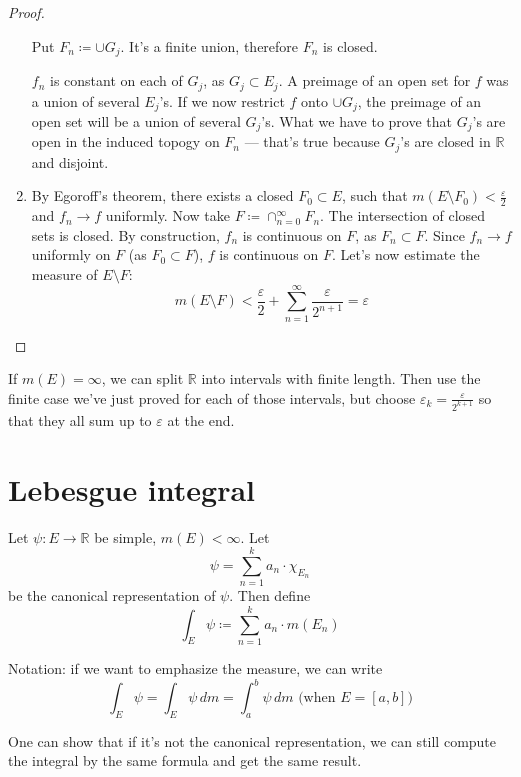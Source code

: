 \begin{proof}
\begin{enumerate}
{            Put $F_n \coloneqq \cup G_j$. It's a finite union, therefore $F_n$ is closed.

            $f_n$ is constant on each of $G_j$, as $G_j \subset E_j$.
            A preimage of an open set for $f$ was a union of several $E_j$'s.
            If we now restrict $f$ onto $\cup G_j$, the preimage of an open set
            will be a union of several $G_j$'s. What we have to prove that 
            $G_j$'s are open in the induced topogy on $F_n$ --- that's 
            true because $G_j$'s are closed in $\mathbb{R}$ and disjoint.
        }
        \item {
            By Egoroff's theorem, there exists a closed $F_0 \subset E$, 
            such that $m(E \setminus F_0) < \frac{\varepsilon}{2}$ and 
            $f_n \to f$ uniformly.
            Now take $F \coloneqq \cap_{n=0}^\infty F_n$. The intersection of closed sets 
            is closed. 
            By construction, $f_n$ is continuous on $F$, as $F_n \subset F$.
            Since $f_n \to f$ uniformly on $F$ (as $F_0 \subset F$),
            $f$ is continuous on $F$.
            Let's now estimate the measure of $E \setminus F$:
            \[
                m(E \setminus F) < \frac{\varepsilon}{2} + 
                \sum_{n=1}^\infty \frac{\varepsilon}{2^{n+1}} = \varepsilon
            \]
        }
    \end{enumerate}
\end{proof}
\begin{remark}
    If $m(E) = \infty$, we can split $\mathbb{R}$ into intervals with finite length.
    Then use the finite case we've just proved for each of those intervals,
    but choose $\varepsilon_k = \frac{\varepsilon}{2^{k + 1}}$ so that they all sum 
    up to $\varepsilon$ at the end.
\end{remark}

\section{Lebesgue integral}
\begin{definition}
    Let $\psi : E \to \mathbb{R}$ be simple, $m(E) < \infty$. Let
    \[ \psi = \sum_{n=1}^k a_n \cdot \chi_{E_n} \]
    be the canonical representation of $\psi$. Then define
    \[ \int_E \psi \coloneqq \sum_{n=1}^k a_n \cdot m(E_n) \]
\end{definition}
\begin{remark}
    Notation: if we want to emphasize the measure, we can write
    \[ \int_E \psi = \int_E \psi \,dm = \int_a^b \psi \,dm \text{ (when $E=[a, b]$)} \]
\end{remark}
\begin{remark}
    One can show that if it's not the canonical representation,
    we can still compute the integral by the same formula and get the same result.
\end{remark}

